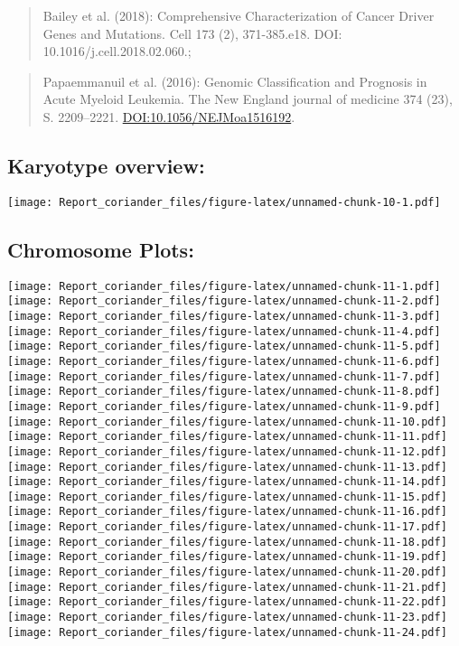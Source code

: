 \documentclass[]{article}
\begin{document}
\begin{quote}
Bailey et al. (2018): Comprehensive Characterization of Cancer Driver
Genes and Mutations. Cell 173 (2), 371-385.e18. DOI:
10.1016/j.cell.2018.02.060.;
\end{quote}

\begin{quote}
Papaemmanuil et al. (2016): Genomic Classification and Prognosis in
Acute Myeloid Leukemia. The New England journal of medicine 374 (23), S.
2209--2221. \url{DOI:10.1056/NEJMoa1516192}.
\end{quote}

\hypertarget{karyotype-overview}{%
\subsection{Karyotype overview:}\label{karyotype-overview}}

\texttt{[image: Report\_coriander\_files/figure-latex/unnamed-chunk-10-1.pdf]}

\hypertarget{chromosome-plots}{%
\subsection{Chromosome Plots:}\label{chromosome-plots}}

\texttt{[image: Report\_coriander\_files/figure-latex/unnamed-chunk-11-1.pdf]}
\texttt{[image: Report\_coriander\_files/figure-latex/unnamed-chunk-11-2.pdf]}
\texttt{[image: Report\_coriander\_files/figure-latex/unnamed-chunk-11-3.pdf]}
\texttt{[image: Report\_coriander\_files/figure-latex/unnamed-chunk-11-4.pdf]}
\texttt{[image: Report\_coriander\_files/figure-latex/unnamed-chunk-11-5.pdf]}
\texttt{[image: Report\_coriander\_files/figure-latex/unnamed-chunk-11-6.pdf]}
\texttt{[image: Report\_coriander\_files/figure-latex/unnamed-chunk-11-7.pdf]}
\texttt{[image: Report\_coriander\_files/figure-latex/unnamed-chunk-11-8.pdf]}
\texttt{[image: Report\_coriander\_files/figure-latex/unnamed-chunk-11-9.pdf]}
\texttt{[image: Report\_coriander\_files/figure-latex/unnamed-chunk-11-10.pdf]}
\texttt{[image: Report\_coriander\_files/figure-latex/unnamed-chunk-11-11.pdf]}
\texttt{[image: Report\_coriander\_files/figure-latex/unnamed-chunk-11-12.pdf]}
\texttt{[image: Report\_coriander\_files/figure-latex/unnamed-chunk-11-13.pdf]}
\texttt{[image: Report\_coriander\_files/figure-latex/unnamed-chunk-11-14.pdf]}
\texttt{[image: Report\_coriander\_files/figure-latex/unnamed-chunk-11-15.pdf]}
\texttt{[image: Report\_coriander\_files/figure-latex/unnamed-chunk-11-16.pdf]}
\texttt{[image: Report\_coriander\_files/figure-latex/unnamed-chunk-11-17.pdf]}
\texttt{[image: Report\_coriander\_files/figure-latex/unnamed-chunk-11-18.pdf]}
\texttt{[image: Report\_coriander\_files/figure-latex/unnamed-chunk-11-19.pdf]}
\texttt{[image: Report\_coriander\_files/figure-latex/unnamed-chunk-11-20.pdf]}
\texttt{[image: Report\_coriander\_files/figure-latex/unnamed-chunk-11-21.pdf]}
\texttt{[image: Report\_coriander\_files/figure-latex/unnamed-chunk-11-22.pdf]}
\texttt{[image: Report\_coriander\_files/figure-latex/unnamed-chunk-11-23.pdf]}
\texttt{[image: Report\_coriander\_files/figure-latex/unnamed-chunk-11-24.pdf]}
\end{document}
